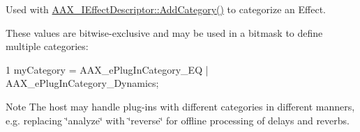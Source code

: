 Used with \hyperlink{a00096_aeb6683e6758f7eb00f87c153e4809641}{A\+A\+X\+\_\+\+I\+Effect\+Descriptor\+::\+Add\+Category()} to categorize an Effect.

These values are bitwise-\/exclusive and may be used in a bitmask to define multiple categories\+:


\begin{DoxyCode}
1 myCategory = AAX\_ePlugInCategory\_EQ | AAX\_ePlugInCategory\_Dynamics;
\end{DoxyCode}


\begin{DoxyNote}{Note}
The host may handle plug-\/ins with different categories in different manners, e.\+g. replacing \char`\"{}analyze\char`\"{} with \char`\"{}reverse\char`\"{} for offline processing of delays and reverbs. 
\end{DoxyNote}
